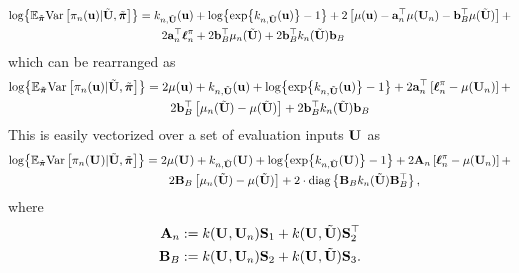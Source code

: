 \documentclass[12pt]{article}
\begin{document}
\begin{align*}
\Log{\E_{\tilde{\boldsymbol{\postDens}}} \Var\left[\unPostPred(\bpar) | \batchMat, \tilde{\boldsymbol{\postDens}} \right]} 
&= \logUnPostKerPred[\designIdx, \batchMat](\bpar) + \Log{\Exp{\logUnPostKerPred[\designIdx, \batchMat](\bpar)} - 1} + 
     2\left[\logUnPostMean(\bpar) - \ba_{\designIdx}^\top \logUnPostMean(\designMat) - \bb_{\Nbatch}^\top \logUnPostMean(\batchMat) \right] + \\ 
     &\qquad 2\ba_{\designIdx}^\top \logUnPostObs + 2\bb_{\Nbatch}^\top \logUnPostMeanPred(\batchMat) + 2\bb_{\Nbatch}^\top \logUnPostKerPred(\batchMat) \bb_{\Nbatch}
\end{align*}
which can be rearranged as
\begin{align*}
\Log{\E_{\tilde{\boldsymbol{\postDens}}} \Var\left[\unPostPred(\bpar) | \batchMat, \tilde{\boldsymbol{\postDens}} \right]} 
&= 2 \logUnPostMean(\bpar) + \logUnPostKerPred[\designIdx, \batchMat](\bpar) + \Log{\Exp{\logUnPostKerPred[\designIdx, \batchMat](\bpar)} - 1} + 
	2\ba_{\designIdx}^\top\left[\logUnPostObs - \logUnPostMean(\designMat) \right] + \\
	&\qquad 2\bb_{\Nbatch}^\top \left[\logUnPostMeanPred(\batchMat) - \logUnPostMean(\batchMat) \right] + 
	2\bb_{\Nbatch}^\top \logUnPostKerPred(\batchMat) \bb_{\Nbatch}
\end{align*}
This is easily vectorized over a set of evaluation inputs $\designMat[]$ as 
\begin{align*}
\Log{\E_{\tilde{\boldsymbol{\postDens}}} \Var\left[\unPostPred(\designMat[]) | \batchMat, \tilde{\boldsymbol{\postDens}} \right]} 
&= 2 \logUnPostMean(\designMat[]) + \logUnPostKerPred[\designIdx, \batchMat](\designMat[]) + \Log{\Exp{\logUnPostKerPred[\designIdx, \batchMat](\designMat[])} - 1} + 
	2\mathbf{A}_{\designIdx}\left[\logUnPostObs - \logUnPostMean(\designMat) \right] + \\
	&\qquad 2\mathbf{B}_{\Nbatch}  \left[\logUnPostMeanPred(\batchMat) - \logUnPostMean(\batchMat) \right] + 
	2 \cdot \text{diag}\left\{\mathbf{B}_{\Nbatch} \logUnPostKerPred(\batchMat) \mathbf{B}_{\Nbatch}^\top  \right\},
\end{align*}
where 
\begin{align*}
\mathbf{A}_{\designIdx} &:= \GPKer(\designMat[], \designMat) \bS_1 + \GPKer(\designMat[], \batchMat) \bS_{2}^\top \\
\mathbf{B}_{\Nbatch} &:=   \GPKer(\designMat[], \designMat) \bS_2  + \GPKer(\designMat[], \batchMat) \bS_{3}.
\end{align*}
\end{document}
